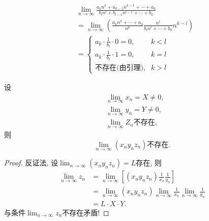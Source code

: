 \begin{example}
    \begin{align}
      & \lim_{n \to \infty} \frac{a_kn^{k}+ a_{k-1}n^{k-1} + \cdots + a_0}{b_l n^{l} + b_{l-1} n^{l-1} + \cdots +b_0}
      \\
      & = \lim_{n \to \infty}\left( \frac{a_kn^{k}+ \cdots +a_0}{n^{k}} \frac{n^{l}}{b_l n^{l}+ \cdots +b_0} n^{k-l} \right) 
      \\
      & = \begin{cases} 
        a_k \cdot \frac{1}{b_l}\cdot 0 = 0 , & k<l 
        \\ 
        a_k\cdot \frac{1}{b_l} \cdot 1 = 0, &  k=l
        \\
        \text{不存在(由引理)} , & k>l
      \end{cases}
    \end{align}
    \begin{lemma}
        设
        \begin{equation}
          \begin{aligned}
            & \lim_{n \to \infty}x_n = X \neq 0,
            \\
            & \lim_{n \to \infty} y_n = Y \neq 0,
            \\
            & \lim_{n \to \infty}Z_n \text{不存在},
          \end{aligned}
        \end{equation}
        则 
        \begin{equation}
          \lim_{n \to \infty} \left( x_n y_n z_n \right) \text{不存在}.
        \end{equation}
    \end{lemma}
    \begin{proof}
        反证法, 设$\displaystyle \lim_{n \to \infty}\left( x_n y_n z_n \right) = L$存在, 则
        \begin{align}
          \lim_{n \to \infty} z_n & = \lim_{n \to \infty} \left[ \left( x_n y_n z_n  \right) \frac{1}{x_n} \frac{1}{y_n} \right] 
          \\
          & = \lim_{n \to \infty} \left( x_n y_n z_n \right) \lim_{n \to \infty} \frac{1}{x_n} \lim_{n \to \infty} \frac{1}{y_n}
          \\
          & = L \cdot X \cdot Y.
        \end{align}
        与条件$\displaystyle \lim_{n \to \infty}z_n \text{不存在}$矛盾!
    \end{proof}
\end{example}

